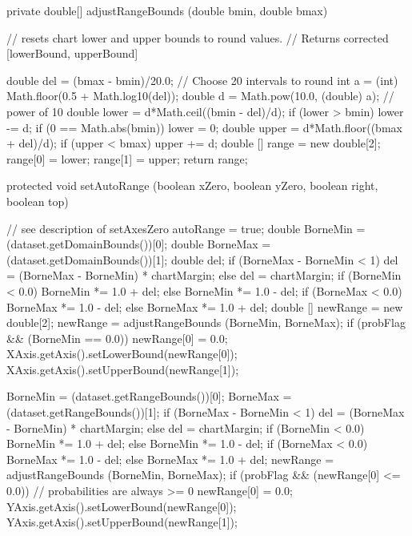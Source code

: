 \begin{htmlonly}
\end{htmlonly}
\begin{code}\begin{hide}
   private double[] adjustRangeBounds (double bmin, double bmax) {
      // resets chart lower and upper bounds to round values.
      // Returns corrected [lowerBound, upperBound]

      double del = (bmax - bmin)/20.0;    // Choose 20 intervals to round
      int a = (int) Math.floor(0.5 + Math.log10(del));
      double d = Math.pow(10.0, (double) a);     // power of 10
      double lower = d*Math.ceil((bmin - del)/d);
      if (lower > bmin)
         lower -= d;
      if (0 == Math.abs(bmin))
         lower = 0;
      double upper = d*Math.floor((bmax + del)/d);
      if (upper < bmax)
         upper += d;
      double [] range = new double[2];
      range[0] = lower;
      range[1] = upper;
      return range;
   }

   protected void setAutoRange (boolean xZero, boolean yZero, boolean right, boolean top) {
      // see description of setAxesZero
      autoRange = true;
      double BorneMin = (dataset.getDomainBounds())[0];
      double BorneMax = (dataset.getDomainBounds())[1];
      double del;
      if (BorneMax - BorneMin < 1)
         del = (BorneMax - BorneMin) * chartMargin;
      else
         del = chartMargin;
      if (BorneMin < 0.0) BorneMin *= 1.0 + del;
      else BorneMin *= 1.0 - del;
      if (BorneMax < 0.0) BorneMax *= 1.0 - del;
      else BorneMax *= 1.0 + del;
      double [] newRange = new double[2];
      newRange = adjustRangeBounds (BorneMin, BorneMax);
      if (probFlag && (BorneMin == 0.0))
         newRange[0] = 0.0;
      XAxis.getAxis().setLowerBound(newRange[0]);
      XAxis.getAxis().setUpperBound(newRange[1]);

      BorneMin = (dataset.getRangeBounds())[0];
      BorneMax = (dataset.getRangeBounds())[1];
      if (BorneMax - BorneMin < 1)
         del = (BorneMax - BorneMin) * chartMargin;
      else
         del = chartMargin;
      if (BorneMin < 0.0) BorneMin *= 1.0 + del;
      else BorneMin *= 1.0 - del;
      if (BorneMax < 0.0) BorneMax *= 1.0 - del;
      else BorneMax *= 1.0 + del;
      newRange = adjustRangeBounds (BorneMin, BorneMax);
      if (probFlag && (newRange[0] <= 0.0))   // probabilities are always >= 0
         newRange[0] = 0.0;
      YAxis.getAxis().setLowerBound(newRange[0]);
      YAxis.getAxis().setUpperBound(newRange[1]);

}
\end{hide}
\end{code}
